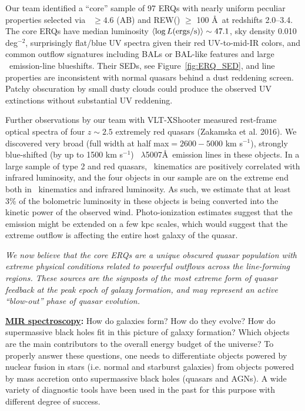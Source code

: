 \smallskip
\smallskip
\noindent
Our team identified a ``core'' sample of 97 ERQs with nearly uniform
peculiar properties selected via \imw\ $\ge 4.6$ (AB) and REW(\civ )
$\ge$ 100 \AA\ at redshifts 2.0--3.4.  The core ERQs have median
luminosity $\left<\log L ({\rm ergs/s})\right> \sim 47.1$, sky density
0.010 deg$^{-2}$, surprisingly flat/blue UV spectra given their red
UV-to-mid-IR colors, and common outflow signatures including BALs or
BAL-like features and large \civ\ emission-line blueshifts. Their
SEDs, see Figure~\ref{fig:ERQ_SED}, and line properties are
inconsistent with normal quasars behind a dust reddening
screen. Patchy obscuration by small dusty clouds could produce the
observed UV extinctions without substantial UV reddening.


\smallskip
\smallskip
\noindent
Further observations by our team with VLT-XShooter measured rest-frame
optical spectra of four $z\sim 2.5$ extremely red quasars (Zakamska et al. 2016).  
We discovered very broad (full width at half max$= 2600-5000$ km
s$^{-1}$), strongly blue-shifted (by up to 1500 km s$^{-1}$)
\oiii\ $\lambda$5007\AA\ emission lines in these objects. In a large
sample of type 2 and red quasars, \oiii\ kinematics are positively
correlated with infrared luminosity, and the four objects in our
sample are on the extreme end both in \oiii\ kinematics and infrared
luminosity.
As such, we estimate that at least 3\% of the bolometric luminosity in
these objects is being converted into the kinetic power of the
observed wind. Photo-ionization estimates suggest that the \oiii
emission might be extended on a few kpc scales, which would suggest
that the extreme outflow is affecting the entire host galaxy of the
quasar.

\smallskip
\smallskip
\noindent
{\it We now believe that the core ERQs are a unique obscured quasar population
with extreme physical conditions related to powerful outflows across
the line-forming regions. These sources are the signposts of the most extreme form of
quasar feedback at the peak epoch of galaxy formation, and may
represent an active ``blow-out'' phase of quasar evolution. 
}


\medskip
\medskip
\smallskip
\smallskip
\noindent
{\bf \underline{MIR spectroscopy}:}
How do galaxies form? How do they evolve? How do supermassive black holes fit in this picture of galaxy formation? Which objects are the main contributors to the overall energy budget of the universe? To properly answer these questions, one needs to differentiate objects powered by nuclear fusion in stars (i.e. normal and starburst galaxies) from objects powered by mass accretion onto supermassive black holes (quasars and AGNs). A wide variety of diagnostic tools have been used in the past for this purpose with different degree of success.

